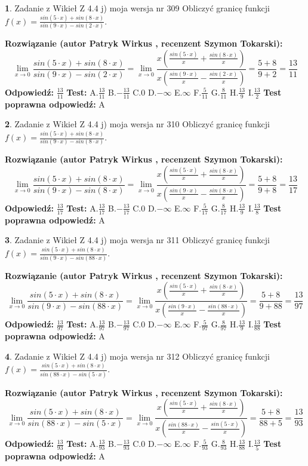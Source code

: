\documentclass[12pt, a4paper]{article}
\theoremstyle{definition} %
\newtheorem{zad}{}
\newcommand{\zadStart}[1]{\begin{zad}#1\newline}
\newcommand{\zadStop}{\end{zad}}
\newcommand{\rozwStart}[2]{\noindent \textbf{Rozwiązanie (autor #1 , recenzent #2): }\newline}
\newcommand{\rozwStop}{\newline}
\newcommand{\odpStart}{\noindent \textbf{Odpowiedź:}\newline}
\newcommand{\odpStop}{\newline}
\newcommand{\testStart}{\noindent \textbf{Test:}\newline}
\newcommand{\testStop}{\newline}
\newcommand{\kluczStart}{\noindent \textbf{Test poprawna odpowiedź:}\newline}
\newcommand{\kluczStop}{\newline}
\begin{document}
\zadStart{Zadanie z Wikieł Z 4.4 j) moja wersja nr 309}
Obliczyć granicę funkcji $f(x)=\frac{sin(5\cdot x) +sin(8\cdot x)}{sin(9\cdot x) -sin(2\cdot x)}$.
\zadStop
\rozwStart{Patryk Wirkus}{Szymon Tokarski}
$$\lim\limits_{x\to 0}\frac{sin(5\cdot x) +sin(8\cdot x)}{sin(9\cdot x) -sin(2\cdot x)}=\lim\limits_{x\to 0}\frac{x(\frac{sin(5\cdot x)}{x}+\frac{sin(8\cdot x)}{x})}{x(\frac{sin(9\cdot x)}{x}-\frac{sin(2\cdot x)}{x})}=\frac{5+8}{9+2} = \frac{13}{11}$$
\rozwStop
\odpStart
$\frac{13}{11}$
\odpStop
\testStart
A.$\frac{13}{11}$
B.$-\frac{13}{11}$
C.$0$
D.$-\infty$
E.$\infty$
F.$\frac{5}{11}$
G.$\frac{8}{11}$
H.$\frac{13}{9}$
I.$\frac{13}{2}$
\testStop
\kluczStart
A
\kluczStop



\zadStart{Zadanie z Wikieł Z 4.4 j) moja wersja nr 310}
Obliczyć granicę funkcji $f(x)=\frac{sin(5\cdot x) +sin(8\cdot x)}{sin(9\cdot x) -sin(8\cdot x)}$.
\zadStop
\rozwStart{Patryk Wirkus}{Szymon Tokarski}
$$\lim\limits_{x\to 0}\frac{sin(5\cdot x) +sin(8\cdot x)}{sin(9\cdot x) -sin(8\cdot x)}=\lim\limits_{x\to 0}\frac{x(\frac{sin(5\cdot x)}{x}+\frac{sin(8\cdot x)}{x})}{x(\frac{sin(9\cdot x)}{x}-\frac{sin(8\cdot x)}{x})}=\frac{5+8}{9+8} = \frac{13}{17}$$
\rozwStop
\odpStart
$\frac{13}{17}$
\odpStop
\testStart
A.$\frac{13}{17}$
B.$-\frac{13}{17}$
C.$0$
D.$-\infty$
E.$\infty$
F.$\frac{5}{17}$
G.$\frac{8}{17}$
H.$\frac{13}{9}$
I.$\frac{13}{8}$
\testStop
\kluczStart
A
\kluczStop



\zadStart{Zadanie z Wikieł Z 4.4 j) moja wersja nr 311}
Obliczyć granicę funkcji $f(x)=\frac{sin(5\cdot x) +sin(8\cdot x)}{sin(9\cdot x) -sin(88\cdot x)}$.
\zadStop
\rozwStart{Patryk Wirkus}{Szymon Tokarski}
$$\lim\limits_{x\to 0}\frac{sin(5\cdot x) +sin(8\cdot x)}{sin(9\cdot x) -sin(88\cdot x)}=\lim\limits_{x\to 0}\frac{x(\frac{sin(5\cdot x)}{x}+\frac{sin(8\cdot x)}{x})}{x(\frac{sin(9\cdot x)}{x}-\frac{sin(88\cdot x)}{x})}=\frac{5+8}{9+88} = \frac{13}{97}$$
\rozwStop
\odpStart
$\frac{13}{97}$
\odpStop
\testStart
A.$\frac{13}{97}$
B.$-\frac{13}{97}$
C.$0$
D.$-\infty$
E.$\infty$
F.$\frac{5}{97}$
G.$\frac{8}{97}$
H.$\frac{13}{9}$
I.$\frac{13}{88}$
\testStop
\kluczStart
A
\kluczStop



\zadStart{Zadanie z Wikieł Z 4.4 j) moja wersja nr 312}
Obliczyć granicę funkcji $f(x)=\frac{sin(5\cdot x) +sin(8\cdot x)}{sin(88\cdot x) -sin(5\cdot x)}$.
\zadStop
\rozwStart{Patryk Wirkus}{Szymon Tokarski}
$$\lim\limits_{x\to 0}\frac{sin(5\cdot x) +sin(8\cdot x)}{sin(88\cdot x) -sin(5\cdot x)}=\lim\limits_{x\to 0}\frac{x(\frac{sin(5\cdot x)}{x}+\frac{sin(8\cdot x)}{x})}{x(\frac{sin(88\cdot x)}{x}-\frac{sin(5\cdot x)}{x})}=\frac{5+8}{88+5} = \frac{13}{93}$$
\rozwStop
\odpStart
$\frac{13}{93}$
\odpStop
\testStart
A.$\frac{13}{93}$
B.$-\frac{13}{93}$
C.$0$
D.$-\infty$
E.$\infty$
F.$\frac{5}{93}$
G.$\frac{8}{93}$
H.$\frac{13}{88}$
I.$\frac{13}{5}$
\testStop
\kluczStart
A
\kluczStop
\end{document}
